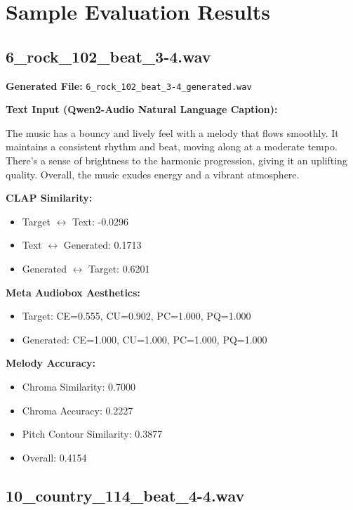\documentclass{article}
\begin{document}
\section{Sample Evaluation Results}

\subsection{6\_rock\_102\_beat\_3-4.wav}

\textbf{Generated File:} \texttt{6\_rock\_102\_beat\_3-4\_generated.wav}

\textbf{Text Input (Qwen2-Audio Natural Language Caption):}

\small
The music has a bouncy and lively feel with a melody that flows smoothly. It maintains a consistent rhythm and beat, moving along at a moderate tempo. There's a sense of brightness to the harmonic progression, giving it an uplifting quality. Overall, the music exudes energy and a vibrant atmosphere.
\normalsize

\textbf{CLAP Similarity:}
\begin{itemize}
    \item Target $\leftrightarrow$ Text: -0.0296
    \item Text $\leftrightarrow$ Generated: 0.1713
    \item Generated $\leftrightarrow$ Target: 0.6201
\end{itemize}

\textbf{Meta Audiobox Aesthetics:}
\begin{itemize}
    \item Target: CE=0.555, CU=0.902, PC=1.000, PQ=1.000
    \item Generated: CE=1.000, CU=1.000, PC=1.000, PQ=1.000
\end{itemize}

\textbf{Melody Accuracy:}
\begin{itemize}
    \item Chroma Similarity: 0.7000
    \item Chroma Accuracy: 0.2227
    \item Pitch Contour Similarity: 0.3877
    \item Overall: 0.4154
\end{itemize}

\subsection{10\_country\_114\_beat\_4-4.wav}
\end{document}
